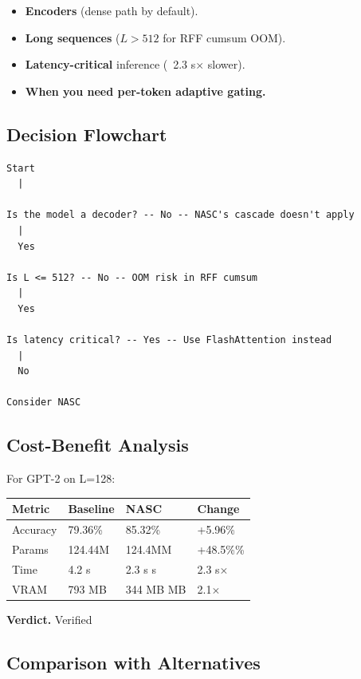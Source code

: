 \begin{itemize}
\item \textbf{Encoders} (dense path by default).
\item \textbf{Long sequences} ($L > 512$ for RFF cumsum OOM).
\item \textbf{Latency-critical} inference (~2.3 s$\times$ slower).
\item \textbf{When you need per-token adaptive gating.}

\end{itemize}
\subsection{Decision Flowchart}

\begin{lstlisting}
Start
  |
   
Is the model a decoder? -- No -- NASC's cascade doesn't apply
  |
  Yes
   
Is L <= 512? -- No -- OOM risk in RFF cumsum
  |
  Yes
   
Is latency critical? -- Yes -- Use FlashAttention instead
  |
  No
   
Consider NASC
\end{lstlisting}

\subsection{Cost-Benefit Analysis}

For GPT-2 on L=128:

\begin{table}[H]
\centering
\small
\begin{tabular}{llll}
\toprule
\textbf{Metric} & \textbf{Baseline} & \textbf{NASC} & \textbf{Change} \\
\midrule
Accuracy & 79.36\% & 85.32\% & +5.96\% \\
Params & 124.44M & 124.4MM & +48.5\%\% \\
Time & 4.2 s & 2.3 s s & 2.3 s$\times$ \\
VRAM & 793 MB & 344 MB MB & 2.1$\times$ \\
\bottomrule
\end{tabular}
\end{table}

\textbf{Verdict.} Verified

\subsection{Comparison with Alternatives}

